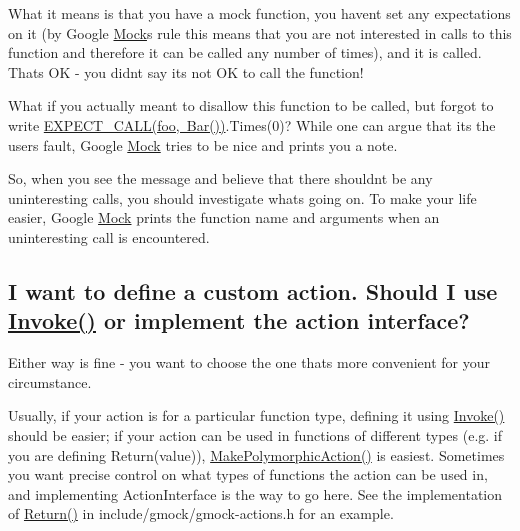 What it means is that you have a mock function, you haven\textquotesingle{}t set any expectations on it (by Google \mbox{\hyperlink{class_mock}{Mock}}\textquotesingle{}s rule this means that you are not interested in calls to this function and therefore it can be called any number of times), and it is called. That\textquotesingle{}s OK -\/ you didn\textquotesingle{}t say it\textquotesingle{}s not OK to call the function!

What if you actually meant to disallow this function to be called, but forgot to write {\ttfamily \mbox{\hyperlink{_obj__test_2lib_2googletest-release-1_88_81_2googlemock_2include_2gmock_2gmock-spec-builders_8h_a535a6156de72c1a2e25a127e38ee5232}{E\+X\+P\+E\+C\+T\+\_\+\+C\+A\+L\+L(foo, Bar())}}.Times(0)}? While one can argue that it\textquotesingle{}s the user\textquotesingle{}s fault, Google \mbox{\hyperlink{class_mock}{Mock}} tries to be nice and prints you a note.

So, when you see the message and believe that there shouldn\textquotesingle{}t be any uninteresting calls, you should investigate what\textquotesingle{}s going on. To make your life easier, Google \mbox{\hyperlink{class_mock}{Mock}} prints the function name and arguments when an uninteresting call is encountered.

\subsection*{I want to define a custom action. Should I use \mbox{\hyperlink{namespacetesting_af5cacf4475557b5a3e37af3836564235}{Invoke()}} or implement the action interface?}

Either way is fine -\/ you want to choose the one that\textquotesingle{}s more convenient for your circumstance.

Usually, if your action is for a particular function type, defining it using {\ttfamily \mbox{\hyperlink{namespacetesting_af5cacf4475557b5a3e37af3836564235}{Invoke()}}} should be easier; if your action can be used in functions of different types (e.\+g. if you are defining {\ttfamily Return(value)}), {\ttfamily \mbox{\hyperlink{namespacetesting_a45df529b8166936d970884383f0ede82}{Make\+Polymorphic\+Action()}}} is easiest. Sometimes you want precise control on what types of functions the action can be used in, and implementing {\ttfamily Action\+Interface} is the way to go here. See the implementation of {\ttfamily \mbox{\hyperlink{namespacetesting_adae3994eb444d1ad2dd602454b854663}{Return()}}} in {\ttfamily include/gmock/gmock-\/actions.\+h} for an example.

